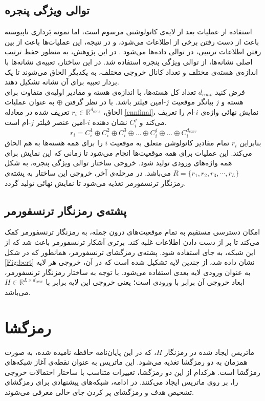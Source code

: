 \subsection{توالی ویژگی پنجره}
استفاده از عملیات  بعد از لایه‌ی کانولوشنی مرسوم است، اما نمونه بَرداری ناپیوسته باعث از دست رفتن برخی از اطلاعات می‌شود، و در نتیجه، این عملیات‌ها باعث از بین رفتن اطلاعات ترتیبی، در توالی داده‌ها می‌شود \cite{Wang:18}. در این پژوهش، به منظور حفظ ترتیب اصلی نشانه‌ها، از توالی ویژگی پنجره استفاده شد. در این ساختار، تعبیه‌ی نشانه‌ها با اندازه‌ی هسته‌ی مختلف و تعداد کانال خروجی مختلف، به یکدیگر الحاق می‌شوند تا یک بردار تعبیه برای آن نشانه تشکیل دهند.\\
فرض کنید $d_{conv}$ تعداد کل هسته‌ها، با اندازه‌ی هسته و مقادیر اولیه‌ی متفاوت برای هسته و $j$ بیانگر موقعیت $j$-امین فیلتر باشد. با در نظر گرفتن $\oplus$ به عنوان عملیات الحاق، $r_{i}\in\mathbb{R}^{d_{conv}}$ تعریف شده در معادله \ref{cnnfinal}، نمایش نهائی واژه‌ی $i$-ام را تعریف می‌کند و $C_{i}^{j}$ نشان دهنده $i$-امین عنصر فیلتر $j$-ام است.
\begin{equation}
	\label{cnnfinal}
	r_{i}=C_{i}^{1} \oplus C_{i}^{2} \oplus C_{i}^{3} \oplus ... \oplus C_{i}^{j} \oplus ... \oplus C_{i}^{d_{conv}}
\end{equation}
بنابراین $r_{i}$ تمام مقادیر کانولوشن متعلق به موقعیت $i$ را برای همه هسته‌ها به هم الحاق می‌کند.
این عملیات برای همه موقعیت‌ها انجام می‌شود تا زمانی که این نمایش برای همه واژه‌های ورودی تولید شود. خروجی ساختار توالی ویژگی پنجره، به شکل $R=\{r_{1},r_{2},r_{3},\cdots,r_{L}\}$ می‌باشد. در مرحله‌ی آخر، خروجی این ساختار به پشته‌ی رمزنگار ترنسفورمر تغذیه می‌شود تا نمایش نهائی تولید گردد.
\subsection{پشته‌ی رمزنگار ترنسفورمر}
امکان دسترسی مستقیم به تمام موقعیت‌های درون جمله، به رمزنگار ترنسفورمر کمک می‌کند تا بر از دست دادن اطلاعات غلبه کند. برتری آشکار ترنسفورمر باعث شد که از این شبکه، به جای   استفاده شود.
پشته‌ی رمزگشای ترنسفورمر، همانطور که در شکل \ref{Fig:bert} نشان داده شد، از چندین لایه تشکیل شده است که در آن، خروجی هر لایه به عنوان ورودی لایه بعدی استفاده می‌شود. با توجه به ساختار رمزنگار ترنسفورمر، ابعاد خروجی آن برابر با ورودی است؛ یعنی خروجی این لایه برابر با $H\in\mathbb{R}^{L\times d_{conv}}$ می‌باشد.

\section{رمزگشا}
ماتریس ایجاد شده در رمزنگار $H$، که در این پایان‌نامه حافظه نامیده شده، به صورت همزمان به دو رمزگشا تغذیه می‌شود. این ماتریس به عنوان نقطه‌ی آغاز شبکه‌های رمزگشا است. هرکدام از این دو رمزگشا، تغییرات متناسب با ساختار احتمالات خروجی را، بر روی ماتریس ایجاد می‌کنند. در ادامه، شبکه‌های پیشنهادی برای رمزگشای تشخیص هدف و رمزگشای پر کردن جای خالی معرفی می‌شوند.
